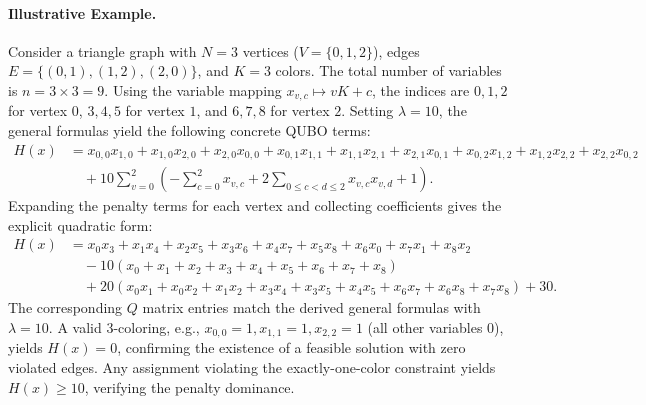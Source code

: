 \documentclass[12pt]{article}
\begin{document}
\paragraph{Illustrative Example.}
Consider a triangle graph with $N=3$ vertices ($V=\{0,1,2\}$), edges $E=\{(0,1), (1,2), (2,0)\}$, and $K=3$ colors. The total number of variables is $n = 3 \times 3 = 9$. Using the variable mapping $x_{v,c} \mapsto vK + c$, the indices are $0,1,2$ for vertex $0$, $3,4,5$ for vertex $1$, and $6,7,8$ for vertex $2$. Setting $\lambda = 10$, the general formulas yield the following concrete QUBO terms:
\begin{align}
    H(x) &= x_{0,0}x_{1,0} + x_{1,0}x_{2,0} + x_{2,0}x_{0,0} + x_{0,1}x_{1,1} + x_{1,1}x_{2,1} + x_{2,1}x_{0,1} + x_{0,2}x_{1,2} + x_{1,2}x_{2,2} + x_{2,2}x_{0,2} \nonumber \\
    &\quad + 10 \sum_{v=0}^{2} \left( -\sum_{c=0}^{2} x_{v,c} + 2 \sum_{0 \le c < d \le 2} x_{v,c} x_{v,d} + 1 \right).
\end{align}
Expanding the penalty terms for each vertex and collecting coefficients gives the explicit quadratic form:
\begin{align}
    H(x) &= x_0 x_3 + x_1 x_4 + x_2 x_5 + x_3 x_6 + x_4 x_7 + x_5 x_8 + x_6 x_0 + x_7 x_1 + x_8 x_2 \nonumber \\
    &\quad -10(x_0+x_1+x_2+x_3+x_4+x_5+x_6+x_7+x_8) \nonumber \\
    &\quad + 20(x_0 x_1 + x_0 x_2 + x_1 x_2 + x_3 x_4 + x_3 x_5 + x_4 x_5 + x_6 x_7 + x_6 x_8 + x_7 x_8) + 30.
\end{align}
The corresponding $Q$ matrix entries match the derived general formulas with $\lambda=10$. A valid 3-coloring, e.g., $x_{0,0}=1, x_{1,1}=1, x_{2,2}=1$ (all other variables $0$), yields $H(x)=0$, confirming the existence of a feasible solution with zero violated edges. Any assignment violating the exactly-one-color constraint yields $H(x) \ge 10$, verifying the penalty dominance.
\end{document}
